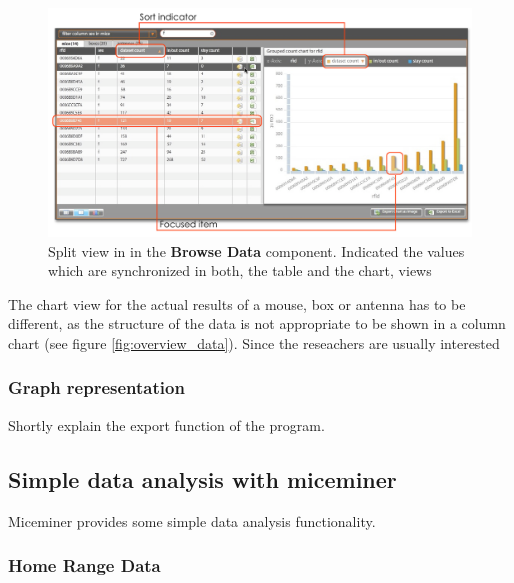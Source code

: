 \begin{figure}[htpb]
\begin{center}
  \includegraphics[width=\textwidth]{assets/pdf/table_chart_view.pdf}
  \caption[Split view]{Split view in in the \textbf{Browse Data} component. Indicated the values which are synchronized in both, the table and the chart, views}
  \label{fig:table_chart_view}
\end{center}
\end{figure}

The chart view for the actual results of a mouse, box or antenna has to be different, as the structure of the data is not appropriate to be shown in a column chart (see figure \ref{fig:overview_data}). Since the reseachers are usually interested

\subsubsection{Graph representation}
\label{subsubsec:graph}

Shortly explain the export function of the program.

\subsection{Simple data analysis with miceminer}
\label{subsec:dataana} 

Miceminer provides some simple data analysis functionality.

\subsubsection{Home Range Data}
\label{subsubsec:homerangedata} 

